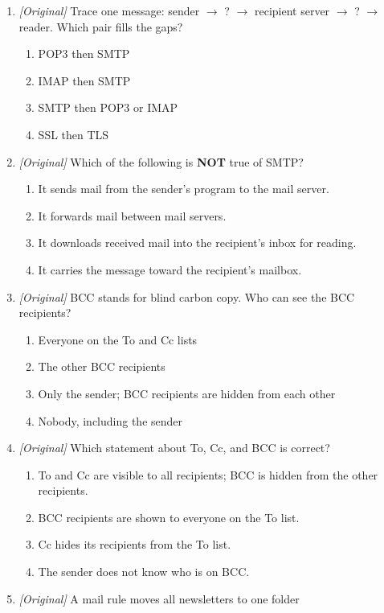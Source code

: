 \documentclass[11pt]{article}
\begin{document}
\begin{enumerate}[label=\textbf{Q\arabic*.}, leftmargin=*]
\item \textit{[Original]} Trace one message: sender $\rightarrow$ ? $\rightarrow$
  recipient server $\rightarrow$ ? $\rightarrow$ reader. Which pair fills the
  gaps?
  \begin{enumerate}[label=\Alph*.]
    \item POP3 then SMTP
    \item IMAP then SMTP
    \item SMTP then POP3 or IMAP
    \item SSL then TLS
  \end{enumerate}
\item \textit{[Original]} Which of the following is \textbf{NOT} true of SMTP?
  \begin{enumerate}[label=\Alph*.]
    \item It sends mail from the sender's program to the mail server.
    \item It forwards mail between mail servers.
    \item It downloads received mail into the recipient's inbox for reading.
    \item It carries the message toward the recipient's mailbox.
  \end{enumerate}
\item \textit{[Original]} BCC stands for blind carbon copy. Who can see the
  BCC recipients?
  \begin{enumerate}[label=\Alph*.]
    \item Everyone on the To and Cc lists
    \item The other BCC recipients
    \item Only the sender; BCC recipients are hidden from each other
    \item Nobody, including the sender
  \end{enumerate}
\item \textit{[Original]} Which statement about To, Cc, and BCC is correct?
  \begin{enumerate}[label=\Alph*.]
    \item To and Cc are visible to all recipients; BCC is hidden from the other recipients.
    \item BCC recipients are shown to everyone on the To list.
    \item Cc hides its recipients from the To list.
    \item The sender does not know who is on BCC.
  \end{enumerate}
\item \textit{[Original]} A mail rule moves all newsletters to one folder

\end{enumerate}
\end{document}
